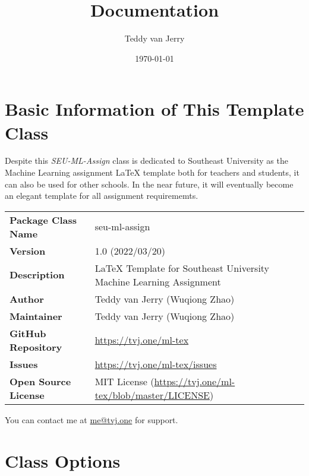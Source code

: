 \documentclass{seu-ml-assign}
\title{Documentation}
\author{Teddy van Jerry}
\date{\today}
\newcommand{\grayrow}{\rowcolor[rgb]{ .906,  .902,  .902}}
\begin{document}
  \maketitle

  \section{Basic Information of This Template Class}

    Despite this \textit{SEU-ML-Assign} class is dedicated to Southeast University as the Machine Learning assignment \LaTeX{} template both for teachers and students, it can also be used for other schools.
    In the near future, it will eventually become an elegant template for all assignment requirememts.

    \begin{table}[htbp]
      \bgroup
        \def\arraystretch{1.2}
        \setlength{\tabcolsep}{1.5em}
        \begin{tabular}{ll}
        \toprule
          \grayrow \textbf{Package Class Name} & seu-ml-assign \\
          \textbf{Version} & 1.0 (2022/03/20) \\
          \grayrow \textbf{Description} & \LaTeX{} Template for Southeast University Machine Learning Assignment \\
          \textbf{Author} & Teddy van Jerry (Wuqiong Zhao) \\
          \grayrow \textbf{Maintainer} & Teddy van Jerry (Wuqiong Zhao) \\
          \textbf{GitHub Repository} & \url{https://tvj.one/ml-tex} \\
          \grayrow \textbf{Issues} & \url{https://tvj.one/ml-tex/issues} \\
          \textbf{Open Source License} & MIT License (\url{https://tvj.one/ml-tex/blob/master/LICENSE}) \\
        \bottomrule
        \end{tabular}%
      \egroup
    \end{table}

    You can contact me at \href{mailto:me@tvj.one}{me@tvj.one} for support.

  \section{Class Options}
\end{document}
